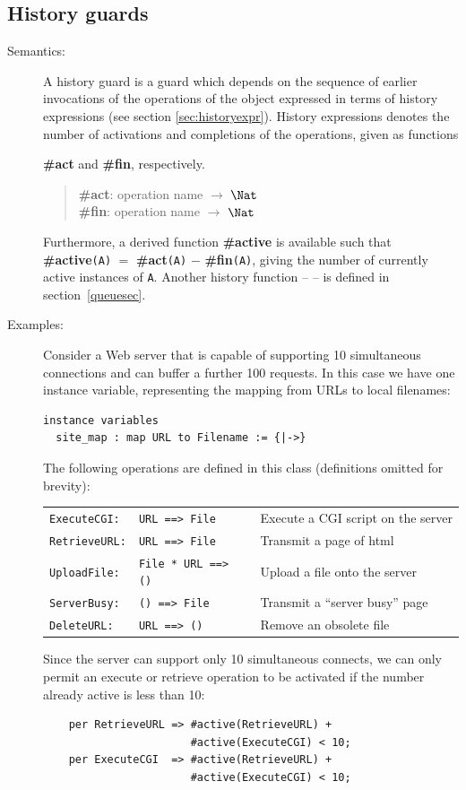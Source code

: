 \documentclass{overturerepchap}
\newcommand{\keyw}[1]{{\bf\ttfamily #1}}
\begin{document}
\subsection{History guards}
\begin{description}
\item[Semantics:] A history guard is a guard which depends on the
sequence of earlier invocations of the operations of the object
expressed in terms of history expressions (see section
\ref{sec:historyexpr}). History expressions denotes the number
of activations and completions of the operations, given as functions

\keyw{\#act} and \keyw{\#fin}, respectively. 
\begin{quote}
\keyw{\#act}: operation name $\rightarrow$ $\Nat$ \\
\keyw{\#fin}: operation name $\rightarrow$ $\Nat$ 
\end{quote}

Furthermore, a derived function {\bf\ttfamily \#active} is available such that
{\bf\ttfamily \#active}{\tt (A}{\tt )} $=$ {\bf\ttfamily \#act}{\tt (A}{\tt )} $-$
{\bf\ttfamily \#fin}{\tt (A}{\tt )}, giving the number of currently active
instances of {\tt A}. Another history function -- {\bf{}} -- is
defined in section~\ref{queuesec}.
\item[Examples:]
Consider a Web server\label{example:webserver} that is capable of
supporting 10 simultaneous 
connections and can buffer a further 100 requests. In this case we
have one instance variable, representing the mapping from URLs to
local filenames:
\begin{lstlisting}
instance variables
  site_map : map URL to Filename := {|->}
\end{lstlisting}

The following operations are defined in this class (definitions
omitted for brevity):

\begin{tabular}{lll}
\texttt{ExecuteCGI:} & \texttt{URL ==> File} & Execute a CGI script on the server\\
\texttt{RetrieveURL:} & \texttt{URL ==> File} & Transmit a page of html\\
\texttt{UploadFile:} & \texttt{File * URL ==> ()} & Upload a file onto the server\\
\texttt{ServerBusy:} & \texttt{() ==> File} & Transmit a ``server busy'' page\\
\texttt{DeleteURL:} & \texttt{URL ==> ()} & Remove an obsolete file
\end{tabular}

Since the server can support only 10 simultaneous connects, we can
only permit an execute or retrieve operation to be activated if the
number already active is less than 10:
\begin{lstlisting}
    per RetrieveURL => #active(RetrieveURL) +
                       #active(ExecuteCGI) < 10;
    per ExecuteCGI  => #active(RetrieveURL) +
                       #active(ExecuteCGI) < 10;
\end{lstlisting}
\end{description}
\end{document}
